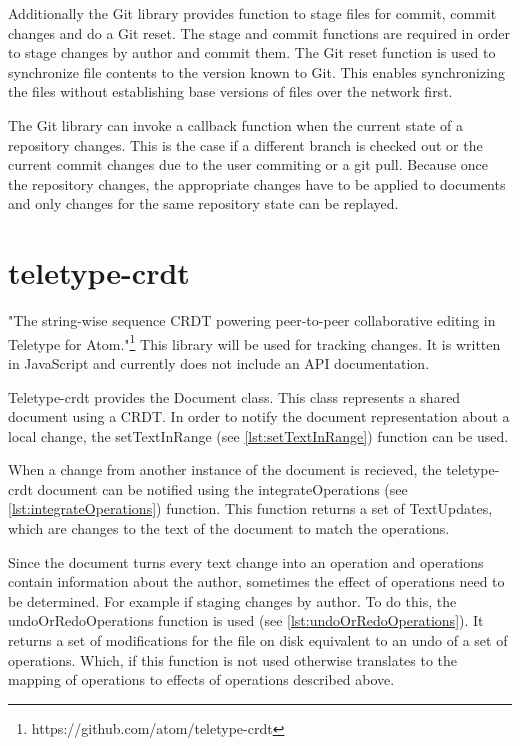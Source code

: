Additionally the Git library provides function to stage files for commit, commit changes and do a Git reset. The stage and commit functions are required in order to stage changes by author and commit them. The Git reset function is used to synchronize file contents to the version known to Git. This enables synchronizing the files without establishing base versions of files over the network first.

The Git library can invoke a callback function when the current state of a repository changes. This is the case if a different branch is checked out or the current commit changes due to the user commiting or a git pull. Because once the repository changes, the appropriate changes have to be applied to documents and only changes for the same repository state can be replayed.

\section{teletype-crdt}
\label{sec:teletypecrdt}

"The string-wise sequence CRDT powering peer-to-peer collaborative editing in Teletype for Atom."\footnote{https://github.com/atom/teletype-crdt}
This library will be used for tracking changes. It is written in JavaScript and currently does not include an API documentation.


Teletype-crdt provides the Document class. This class represents a shared document using a CRDT. In order to notify the document representation about a local change, the setTextInRange (see \autoref{lst:setTextInRange}) function can be used.

When a change from another instance of the document is recieved, the teletype-crdt document can be notified using the integrateOperations (see \autoref{lst:integrateOperations}) function. This function returns a set of TextUpdates, which are changes to the text of the document to match the operations.

Since the document turns every text change into an operation and operations contain information about the author, sometimes the effect of operations need to be determined. For example if staging changes by author. To do this, the undoOrRedoOperations function is used (see \autoref{lst:undoOrRedoOperations}). It returns a set of modifications for the file on disk equivalent to an undo of a set of operations. Which, if this function is not used otherwise translates to the mapping of operations to effects of operations described above.


